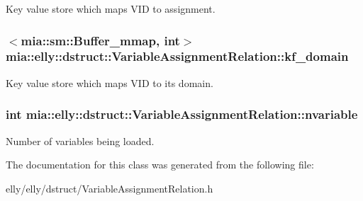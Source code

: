 Key value store which maps V\-I\-D to assignment. \hypertarget{classmia_1_1elly_1_1dstruct_1_1_variable_assignment_relation_afe97d67e61ae540774ef75c980c6a213}{
\subsubsection[{kf\-\_\-domain}]{$<${\bf mia\-::sm\-::\-Buffer\-\_\-mmap}, int$>$ mia\-::elly\-::dstruct\-::\-Variable\-Assignment\-Relation\-::kf\-\_\-domain}}\label{classmia_1_1elly_1_1dstruct_1_1_variable_assignment_relation_afe97d67e61ae540774ef75c980c6a213}
Key value store which maps V\-I\-D to its domain. \hypertarget{classmia_1_1elly_1_1dstruct_1_1_variable_assignment_relation_ad2dca4f9ea916afc044726130e6f8312}{
\subsubsection[{nvariable}]{\setlength{\rightskip}{0pt plus 5cm}int mia\-::elly\-::dstruct\-::\-Variable\-Assignment\-Relation\-::nvariable}}\label{classmia_1_1elly_1_1dstruct_1_1_variable_assignment_relation_ad2dca4f9ea916afc044726130e6f8312}
Number of variables being loaded. 

The documentation for this class was generated from the following file\-:\begin{DoxyCompactItemize}
\item 
elly/elly/dstruct/Variable\-Assignment\-Relation.\-h\end{DoxyCompactItemize}
